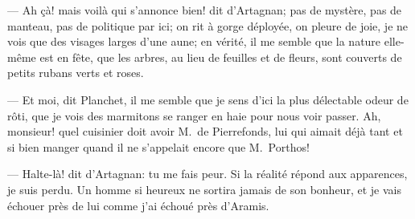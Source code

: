 — Ah çà! mais voilà qui s'annonce bien! dit d'Artagnan; pas de mystère, pas de manteau, pas de politique par ici; on rit à gorge déployée, on pleure de joie, je ne vois que des visages larges d'une aune; en vérité, il me semble que la nature elle-même est en fête, que les arbres, au lieu de feuilles et de fleurs, sont couverts de petits rubans verts et roses.

— Et moi, dit Planchet, il me semble que je sens d'ici la plus délectable odeur de rôti, que je vois des marmitons se ranger en haie pour nous voir passer. Ah, monsieur! quel cuisinier doit avoir M.~de Pierrefonds, lui qui aimait déjà tant et si bien manger quand il ne s'appelait encore que M.~Porthos!

— Halte-là! dit d'Artagnan: tu me fais peur. Si la réalité répond aux apparences, je suis perdu. Un homme si heureux ne sortira jamais de son bonheur, et je vais échouer près de lui comme j'ai échoué près d'Aramis.